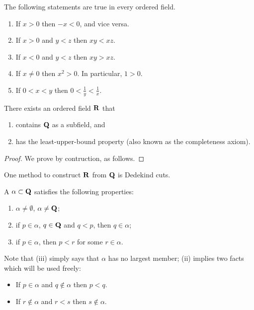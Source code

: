 \begin{proposition}
The following statements are true in every ordered field.
\begin{enumerate}[label=(\arabic*)]
\item If $x>0$ then $-x<0$, and vice versa.
\item If $x>0$ and $y<z$ then $xy<xz$.
\item If $x<0$ and $y<z$ then $xy>xz$.
\item If $x\neq0$ then $x^2>0$. In particular, $1>0$.
\item If $0<x<y$ then $0<\frac{1}{y}<\frac{1}{x}$.
\end{enumerate}
\end{proposition}

\begin{theorem}
There exists an ordered field $\mathbf R$ that
\begin{enumerate}[label=(\roman*)]
\item contains $\mathbf Q$ as a subfield, and
\item has the least-upper-bound property (also known as the completeness axiom).
\end{enumerate}
\end{theorem}

\begin{proof}
We prove by contruction, as follows. 
\end{proof}

One method to construct $\mathbf R$ from $\mathbf Q$ is Dedekind cuts.

\begin{definition*}
A  $\alpha\subset\mathbf Q$ satisfies the following properties:
\begin{enumerate}[label=(\roman*)]
\item $\alpha\neq\emptyset$, $\alpha\neq\mathbf Q$;
\item if $p\in\alpha$, $q\in\mathbf Q$ and $q<p$, then $q\in\alpha$;
\item if $p\in\alpha$, then $p<r$ for some $r\in\alpha$.
\end{enumerate}
\end{definition*}

Note that (iii) simply says that $\alpha$ has no largest member; (ii) implies two facts which will be used freely:
\begin{itemize}
\item If $p\in\alpha$ and $q\notin\alpha$ then $p<q$.
\item If $r\notin\alpha$ and $r<s$ then $s\notin\alpha$.
\end{itemize}

